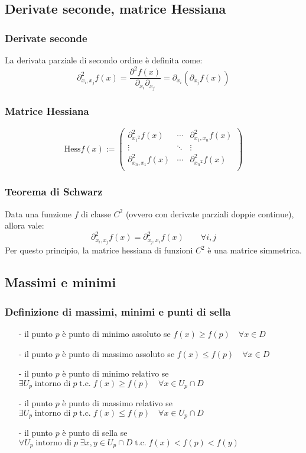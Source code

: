 \documentclass[a4paper]{article}
\newcommand\tc{\text{t.c.}}   %
\begin{document}
\newpage

\subsection{Derivate seconde, matrice Hessiana}
\subsubsection*{Derivate seconde}
La derivata parziale di secondo ordine è definita come:
\[\partial^2_{x_i,x_j} f(x) = \frac{\partial^2 f(x)}{\partial_{x_i} \partial_{x_j}} = \partial_{x_i} (\partial_{x_j} f(x))\]

\subsubsection*{Matrice Hessiana}
\[\text{Hess}f(x) := \left( \begin{matrix}
	\partial^2_{{x_1}^2} f(x) & \cdots & \partial^2_{{x_1,x_n}} f(x) \\
	\vdots & \ddots & \vdots \\
	\partial^2_{{x_n,x_1}} f(x) & \cdots & \partial^2_{{x_n}^2} f(x) \\
\end{matrix} \right) \]

\subsubsection*{Teorema di Schwarz}
Data una funzione \(f\) di classe \(C^2\) (ovvero con derivate parziali doppie continue), allora vale:
\[\partial^2_{x_i,x_j} f(x) = \partial^2_{x_j,x_i} f(x) \qquad \forall i,j\]
Per questo principio, la matrice hessiana di funzioni \(C^2\) è una matrice simmetrica.

\subsection{Massimi e minimi}
\subsubsection*{Definizione di massimi, minimi e punti di sella}
\begin{itemize}[topsep=3pt, itemsep=0pt]
	\item[-] il punto \(p\) è punto di minimo assoluto se \(f(x) \geq f(p) \quad \forall x \in D\)
	\item[-] il punto \(p\) è punto di massimo assoluto se \(f(x) \leq f(p) \quad \forall x \in D\)
	\item[-] il punto \(p\) è punto di minimo relativo se \(\exists U_p \; \text{intorno di} \; p \; \tc \; f(x) \geq f(p) \quad \forall x \in U_p \cap D\)
	\item[-] il punto \(p\) è punto di massimo relativo se \(\exists U_p \; \text{intorno di} \; p \; \tc \; f(x) \leq f(p) \quad \forall x \in U_p \cap D\)
	\item[-] il punto \(p\) è punto di sella se \(\forall U_p \; \text{intorno di} \; p \; \exists x,y \in U_p \cap D \; \tc \; f(x) < f(p) < f(y)\)
\end{itemize}
\end{document}
